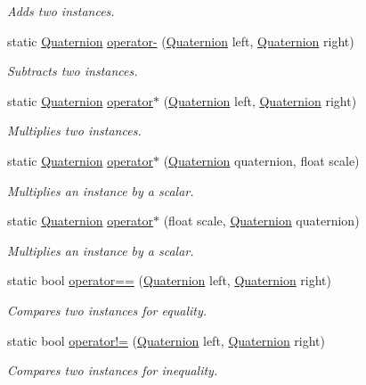 \begin{DoxyCompactItemize}
\begin{DoxyCompactList}\small\item\em Adds two instances. \end{DoxyCompactList}\item 
static \hyperlink{struct_open_t_k_1_1_quaternion}{Quaternion} \hyperlink{struct_open_t_k_1_1_quaternion_a848dc62ea8c62fba5754caa400439428}{operator-\/} (\hyperlink{struct_open_t_k_1_1_quaternion}{Quaternion} left, \hyperlink{struct_open_t_k_1_1_quaternion}{Quaternion} right)
\begin{DoxyCompactList}\small\item\em Subtracts two instances. \end{DoxyCompactList}\item 
static \hyperlink{struct_open_t_k_1_1_quaternion}{Quaternion} \hyperlink{struct_open_t_k_1_1_quaternion_aad1164cd81a83b59b0f769e90a4a944e}{operator$\ast$} (\hyperlink{struct_open_t_k_1_1_quaternion}{Quaternion} left, \hyperlink{struct_open_t_k_1_1_quaternion}{Quaternion} right)
\begin{DoxyCompactList}\small\item\em Multiplies two instances. \end{DoxyCompactList}\item 
static \hyperlink{struct_open_t_k_1_1_quaternion}{Quaternion} \hyperlink{struct_open_t_k_1_1_quaternion_ad8968c9f9573910c22591929281146d0}{operator$\ast$} (\hyperlink{struct_open_t_k_1_1_quaternion}{Quaternion} quaternion, float scale)
\begin{DoxyCompactList}\small\item\em Multiplies an instance by a scalar. \end{DoxyCompactList}\item 
static \hyperlink{struct_open_t_k_1_1_quaternion}{Quaternion} \hyperlink{struct_open_t_k_1_1_quaternion_a2d72651a42a17832233bbf907ee863b5}{operator$\ast$} (float scale, \hyperlink{struct_open_t_k_1_1_quaternion}{Quaternion} quaternion)
\begin{DoxyCompactList}\small\item\em Multiplies an instance by a scalar. \end{DoxyCompactList}\item 
static bool \hyperlink{struct_open_t_k_1_1_quaternion_a6153f36272b85146421d17e5fa611425}{operator==} (\hyperlink{struct_open_t_k_1_1_quaternion}{Quaternion} left, \hyperlink{struct_open_t_k_1_1_quaternion}{Quaternion} right)
\begin{DoxyCompactList}\small\item\em Compares two instances for equality. \end{DoxyCompactList}\item 
static bool \hyperlink{struct_open_t_k_1_1_quaternion_a9303285e5fbd0c4c329844a9e021ea29}{operator!=} (\hyperlink{struct_open_t_k_1_1_quaternion}{Quaternion} left, \hyperlink{struct_open_t_k_1_1_quaternion}{Quaternion} right)
\begin{DoxyCompactList}\small\item\em Compares two instances for inequality. \end{DoxyCompactList}\end{DoxyCompactItemize}

